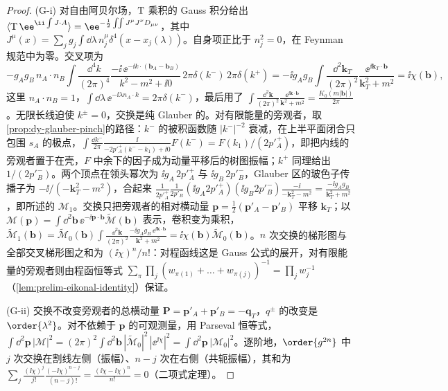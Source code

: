 \begin{proof}
(G-i) 对自由阿贝尔场，${\rm T}$ 乘积的 Gauss 积分给出 $\langle{\rm T}\,\ee^{\ii\int J\cdot A}\rangle=\ee^{-\frac12\int\!\!\int J^\mu J^\nu D_{\mu\nu}}$，其中 $J^\mu(x)=\sum_jg_j\int\dd\lambda\,n_j^\mu\delta^4(x-x_j(\lambda))$。自身项正比于 $n_j^2=0$，在 Feynman 规范中为零。交叉项为
\[
-g_Ag_B\,n_A\cdot n_B\int\frac{\dd^4k}{(2\pi)^4}\frac{-\ii\,\ee^{-\ii k\cdot(\boldsymbol b_A-\boldsymbol b_B)}}{k^2-m^2+\ii0}\,2\pi\delta(k^-)\,2\pi\delta(k^+)
=-\ii g_Ag_B\int\frac{\dd^2\mathbf k_T}{(2\pi)^2}\frac{\ee^{\ii\mathbf k_T\cdot\boldsymbol b}}{\mathbf k_T^2+m^2}=\ii\chi(\boldsymbol b),
\]
这里 $n_A\cdot n_B=1$，$\int\dd\lambda\,\ee^{-\ii\lambda n_A\cdot k}=2\pi\delta(k^-)$，最后用了 $\int\frac{\dd^2\mathbf k}{(2\pi)^2}\frac{\ee^{\ii\mathbf k\cdot\boldsymbol b}}{\mathbf k^2+m^2}=\frac{K_0(m|\boldsymbol b|)}{2\pi}$。无限长线迫使 $k^\pm=0$，交换是纯 Glauber 的。对有限能量的旁观者，取\cref{prop:dy-glauber-pinch}的路径：$k^-$ 的被积函数随 $|k^-|^{-2}$ 衰减，在上半平面闭合只包围 $s_A$ 的极点，$\int\frac{\dd k^-}{2\pi}\frac{\ii}{-2p'^+_A(k^--k_1)+\ii0}F(k^-)=F(k_1)/(2p'^+_A)$，即把内线的旁观者置于在壳，$F$ 中余下的因子成为动量平移后的树图振幅；$k^+$ 同理给出 $1/(2p'^-_B)$。两个顶点在领头幂次为 $\ii g_A\,2p'^+_A$ 与 $\ii g_B\,2p'^-_B$，Glauber 区的玻色子传播子为 $-\ii/(-\mathbf k_T^2-m^2)$，合起来
$\frac{1}{2p'^+_A}\frac{1}{2p'^-_B}(\ii g_A2p'^+_A)(\ii g_B2p'^-_B)\frac{-\ii}{-\mathbf k_T^2-m^2}=\frac{-\ii g_Ag_B}{\mathbf k_T^2+m^2}$，即所述的 $\mathcal M_1$。交换只把旁观者的相对横动量 $\boldsymbol p=\frac12(\mathbf p'_A-\mathbf p'_B)$ 平移 $\mathbf k_T$；以 $\mathcal M(\boldsymbol p)=\int\dd^2\boldsymbol b\,\ee^{-\ii\boldsymbol p\cdot\boldsymbol b}\tilde{\mathcal M}(\boldsymbol b)$ 表示，卷积变为乘积，$\tilde{\mathcal M}_1(\boldsymbol b)=\tilde{\mathcal M}_0(\boldsymbol b)\int\frac{\dd^2\mathbf k}{(2\pi)^2}\frac{-\ii g_Ag_B\,\ee^{\ii\mathbf k\cdot\boldsymbol b}}{\mathbf k^2+m^2}=\ii\chi(\boldsymbol b)\tilde{\mathcal M}_0(\boldsymbol b)$。$n$ 次交换的梯形图与全部交叉梯形图之和为 $(\ii\chi)^n/n!$：对程函线这是 Gauss 公式的展开，对有限能量的旁观者则由程函恒等式 $\sum_{\pi}\prod_j(w_{\pi(1)}+\dots+w_{\pi(j)})^{-1}=\prod_jw_j^{-1}$（\cref{lem:prelim-eikonal-identity}）保证。

(G-ii) 交换不改变旁观者的总横动量 $\boldsymbol P=\mathbf p'_A+\mathbf p'_B=-\mathbf q_T$，$q^\pm$ 的改变是 $\order{\lambda^2}$。对不依赖于 $\boldsymbol p$ 的可观测量，用 Parseval 恒等式，
$\int\dd^2\boldsymbol p\,|\mathcal M|^2=(2\pi)^2\int\dd^2\boldsymbol b\,|\tilde{\mathcal M}_0|^2\,|\ee^{\ii\chi}|^2=\int\dd^2\boldsymbol p\,|\mathcal M_0|^2$。逐阶地，$\order{g^{2n}}$ 中 $j$ 次交换在割线左侧（振幅）、$n-j$ 次在右侧（共轭振幅），其和为 $\sum_j\frac{(\ii\chi)^j}{j!}\frac{(-\ii\chi)^{n-j}}{(n-j)!}=\frac{(\ii\chi-\ii\chi)^n}{n!}=0$（二项式定理）。


\end{proof}
